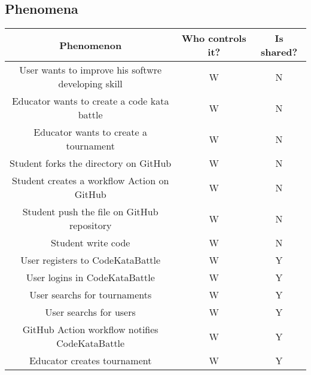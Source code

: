 \documentclass{article}
\begin{document}
\subsection{Phenomena}
\begin{center}
    \begin{table}
        \begin{tabularx}{\textwidth}{| c| c| c|}
            \hline
            \rowcolor{blue!50}
            Phenomenon                                                            & Who controls it? & Is shared? \\
            \hline
            User wants to improve his softwre developing skill                    & W                & N          \\
            Educator wants to create a code kata battle                           & W                & N          \\
            Educator wants to create a tournament                                 & W                & N          \\
            Student forks the directory on GitHub                                 & W                & N          \\
            Student creates a workflow Action on GitHub                           & W                & N          \\
            Student push the file on GitHub repository                            & W                & N          \\
            Student write code                                                    & W                & N          \\
            User registers to CodeKataBattle                                      & W                & Y          \\
            User logins in CodeKataBattle                                         & W                & Y          \\
            User searchs for tournaments                                          & W                & Y          \\
            User searchs for users                                                & W                & Y          \\
            GitHub Action workflow notifies CodeKataBattle                        & W                & Y          \\
            Educator creates tournament                                           & W                & Y          \\

\end{tabularx}
\end{table}
\end{center}
\end{document}

